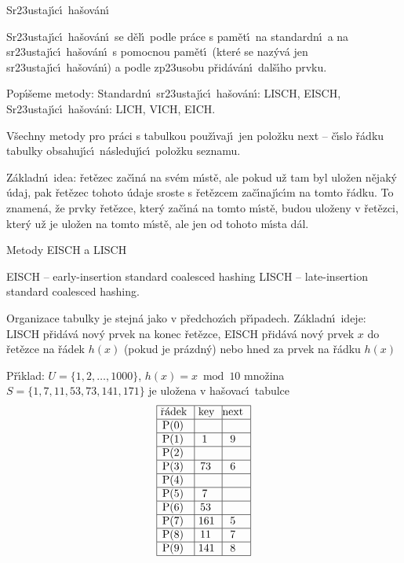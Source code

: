 \documentclass[a4paper,12pt]{article}
\begin{document}
\heading
Sr\accent23ustaj\'\i c\'\i\ ha\v sov\'an\'\i
\endheading

\flushpar Sr\accent23ustaj\'\i c\'\i\ ha\v sov\'an\'\i\ se d\v el\'\i\ podle pr\'ace s 
pam\v et\'\i\ na standardn\'\i\ a na sr\accent23ustaj\'\i c\'\i\ ha\v sov\'an\'\i\ 
s pomocnou pam\v et\'\i\ (kter\'e se naz\'yv\'a jen 
sr\accent23ustaj\'\i c\'\i\ ha\v sov\'an\'\i ) a podle zp\accent23usobu 
p\v rid\'av\'an\'\i\ dal\v s\'\i ho prvku.
\medskip

\flushpar Pop\'\i\v seme metody:\newline 
\phantom{---}Standardn\'\i\ sr\accent23ustaj\'\i c\'\i\ ha\v sov\'an\'\i : LISCH, EISCH,\newline 
\phantom{---}Sr\accent23ustaj\'\i c\'\i\ ha\v sov\'an\'\i : LICH, VICH, EICH.
\medskip

\flushpar V\v sechny metody pro pr\'aci s tabulkou pou\v z\'\i vaj\'\i\ jen 
polo\v zku next -- \v c\'\i slo \v r\'adku tabulky obsahuj\'\i c\'\i\ 
n\'asleduj\'\i c\'\i\ polo\v zku seznamu. 

\flushpar Z\'akladn\'\i\ idea: \v ret\v ezec za\v c\'\i n\'a na sv\'em m\'\i st\v e, ale 
pokud u\v z tam byl ulo\v zen 
n\v ejak\'y \'udaj, pak \v ret\v ezec tohoto \'udaje sroste s \v ret\v ezcem 
za\v c\'\i naj\'\i c\'\i m na tomto \v r\'adku. To znamen\'a, \v ze prvky \v ret\v ezce, kter\'y za\v c\'\i n\'a na tomto m\'\i st\v e, budou ulo\v zeny v \v ret\v ezci, kter\'y u\v z je ulo\v zen na tomto m\'\i st\v e, ale jen od tohoto m\'\i sta d\'al.
\medskip

\subhead
Metody EISCH a LISCH
\endsubhead

\phantom{---}EISCH -- early-insertion standard coalesced hashing\newline 
\phantom{---}LISCH -- late-insertion standard coalesced hashing.
 
\flushpar Organizace tabulky je stejn\'a jako v p\v redchoz\'\i ch 
p\v r\'\i padech.\newline 
Z\'akladn\'\i\ ideje: LISCH p\v rid\'av\'a nov\'y prvek na konec 
\v ret\v ezce, \newline 
EISCH p\v rid\'av\'a nov\'y prvek $x$ do \v ret\v ezce na 
\v r\'adek $h(x)$ (pokud je pr\'azdn\'y) nebo hned za prvek na \v r\'adku $h(x)$\newline 

\flushpar P\v r\'\i klad: $U=\{1,2,\dots,1000\}$, $h(x)=x\bmod10$\newline 
mno\v zina $S=\{1,7,11,53,73,141,171\}$ je ulo\v zena 
v ha\v sovac\'\i\ tabulce
$$\vtop{\offinterlineskip\halign {\strut\vrule\ # & \vrule\ # & \vrule \hfil # \hfil \vrule\cr\noalign{\hrule}\v r\'adek & key & next \hfil \cr\noalign{\hrule}P(0) & &\hfill \cr\noalign{\hrule}P(1) & 1 & 9 \cr\noalign{\hrule}P(2) & &\hfill \cr\noalign{\hrule}P(3) & 73 & 6 \cr\noalign{\hrule}P(4) &  &\hfill \cr\noalign{\hrule}P(5) & 7 & \hfill \cr\noalign{\hrule}P(6) & 53 &\hfill \cr\noalign{\hrule}P(7) & 161 & 5 \cr\noalign{\hrule}P(8) & 11 & 7  \cr\noalign{\hrule}P(9) & 141 & 8 \cr\noalign{\hrule}}}$$
\end{document}
